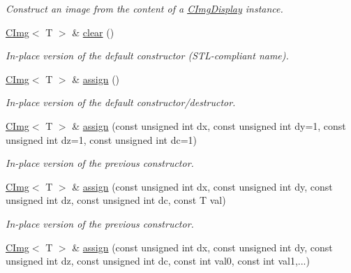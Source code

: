 \begin{DoxyCompactItemize}
\begin{DoxyCompactList}\small\item\em Construct an image from the content of a \hyperlink{structcimg__library_1_1CImgDisplay}{CImgDisplay} instance. \item\end{DoxyCompactList}\item 
\hyperlink{structcimg__library_1_1CImg}{CImg}$<$ T $>$ \& \hyperlink{structcimg__library_1_1CImg_ab5cdf8f13cc7065fef4da8214ff36d5d}{clear} ()
\begin{DoxyCompactList}\small\item\em In-\/place version of the default constructor (STL-\/compliant name). \item\end{DoxyCompactList}\item 
\hyperlink{structcimg__library_1_1CImg}{CImg}$<$ T $>$ \& \hyperlink{structcimg__library_1_1CImg_a65018fb0cbdbd9e8d1404321cd69bfe5}{assign} ()
\begin{DoxyCompactList}\small\item\em In-\/place version of the default constructor/destructor. \item\end{DoxyCompactList}\item 
\hyperlink{structcimg__library_1_1CImg}{CImg}$<$ T $>$ \& \hyperlink{structcimg__library_1_1CImg_aa04f124beb85fd91a13d3abc4fc83cb4}{assign} (const unsigned int dx, const unsigned int dy=1, const unsigned int dz=1, const unsigned int dc=1)
\begin{DoxyCompactList}\small\item\em In-\/place version of the previous constructor. \item\end{DoxyCompactList}\item 
\hyperlink{structcimg__library_1_1CImg}{CImg}$<$ T $>$ \& \hyperlink{structcimg__library_1_1CImg_aa6265772f4f357317bca4c0cf677c462}{assign} (const unsigned int dx, const unsigned int dy, const unsigned int dz, const unsigned int dc, const T val)
\begin{DoxyCompactList}\small\item\em In-\/place version of the previous constructor. \item\end{DoxyCompactList}\item 
\hypertarget{structcimg__library_1_1CImg_a62852353ef630d4b25e6bfb487c2bb89}{
\hyperlink{structcimg__library_1_1CImg}{CImg}$<$ T $>$ \& \hyperlink{structcimg__library_1_1CImg_a62852353ef630d4b25e6bfb487c2bb89}{assign} (const unsigned int dx, const unsigned int dy, const unsigned int dz, const unsigned int dc, const int val0, const int val1,...)}
\label{structcimg__library_1_1CImg_a62852353ef630d4b25e6bfb487c2bb89}


\end{DoxyCompactItemize}
